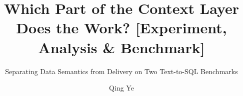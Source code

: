 \documentclass[sigconf,nonacm]{acmart}
\title[Which Part of the Context Layer Does the Work?]{Which Part of the Context Layer Does the Work? [Experiment, Analysis \& Benchmark]}
\subtitle{Separating Data Semantics from Delivery on Two Text-to-SQL Benchmarks}
\author{Qing Ye}
\affiliation{\institution{Independent Researcher}\country{}}
\begin{document}
\raggedbottom

\begin{abstract}

\end{abstract}

\maketitle

\vldbtopmatter












\label{end:content}



\end{document}
